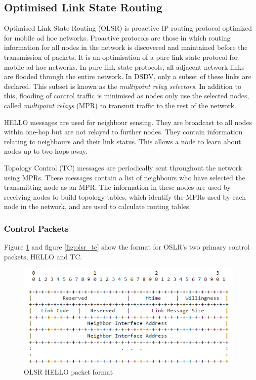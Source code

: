       \subsection{Optimised Link State Routing}
    Optimised Link State Routing (OLSR) \cite{RFC3626} is proactive IP routing protocol
    optimized for mobile ad hoc networks. Proactive protocols are those in which
    routing information for all nodes in the network is discovered and maintained
    before the transmission of packets. It is an optimisation of a pure link state
    protocol for mobile ad-hoc networks. In pure link state protocols, all adjacent
    network links are flooded through the entire network. In
    DSDV, only a subset of these links are declared. This subset is known as the
    \textit{multipoint relay selectors}. In addition to this, flooding of control
    traffic is minimised as nodes only use the selected nodes, called \textit{multipoint
    relays} (MPR) to transmit traffic to the rest of the network.

    HELLO messages are used for neighbour sensing. They are broadcast to all
    nodes within one-hop but are not relayed to further nodes. They contain
    information relating to neighbours and their link status. This allows
    a node to learn about nodes up to two hops away.

    Topology Control (TC) messages are periodically sent throughout the network
    using MPRs. These messages contain a list of neighbours who have selected
    the transmitting node as an MPR. The information in these nodes are used by
    receiving nodes to build topology tables, which identify the MPRs used by
    each node in the network, and are used to calculate routing tables.

        \subsubsection{Control Packets}
    Figure \ref{fig:olsr_hello} and figure \ref{fig:olsr_tc} show the format
    for OSLR's two primary control packets, HELLO and TC.
    \FloatBarrier
    \begin{figure}[ht]
      \includegraphics[scale=0.75]{Images/chapter2/olsr_hello.png}
      \caption{OLSR HELLO packet format}
      \label{fig:olsr_hello}
    \end{figure}
    \FloatBarrier

